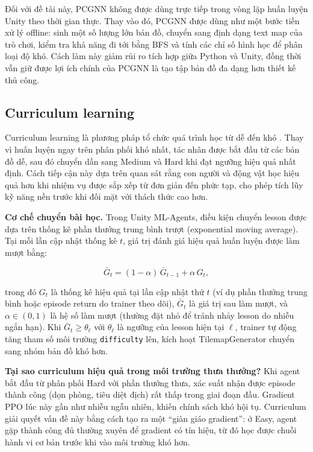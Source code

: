 Đối với đề tài này, PCGNN không được dùng trực tiếp trong vòng lặp huấn luyện Unity theo thời gian thực. Thay vào đó, PCGNN được dùng như một bước tiền xử lý offline: sinh một số lượng lớn bản đồ, chuyển sang định dạng text map của trò chơi, kiểm tra khả năng đi tới bằng BFS và tính các chỉ số hình học để phân loại độ khó. Cách làm này giảm rủi ro tích hợp giữa Python và Unity, đồng thời vẫn giữ được lợi ích chính của PCGNN là tạo tập bản đồ đa dạng hơn thiết kế thủ công.

\subsection{Curriculum learning}

Curriculum learning là phương pháp tổ chức quá trình học từ dễ đến khó \cite{Bengio2009}. Thay vì huấn luyện ngay trên phân phối khó nhất, tác nhân được bắt đầu từ các bản đồ dễ, sau đó chuyển dần sang Medium và Hard khi đạt ngưỡng hiệu quả nhất định. Cách tiếp cận này dựa trên quan sát rằng con người và động vật học hiệu quả hơn khi nhiệm vụ được sắp xếp từ đơn giản đến phức tạp, cho phép tích lũy kỹ năng nền trước khi đối mặt với thách thức cao hơn.

\textbf{Cơ chế chuyển bài học.} Trong Unity ML-Agents, điều kiện chuyển lesson được dựa trên thống kê phần thưởng trung bình trượt (exponential moving average). Tại mỗi lần cập nhật thống kê $t$, giá trị đánh giá hiệu quả huấn luyện được làm mượt bằng:

\begin{equation}
    \bar{G}_t = (1 - \alpha)\,\bar{G}_{t-1} + \alpha\, G_t,
    \label{eq:curriculum_ema}
\end{equation}

trong đó $G_t$ là thống kê hiệu quả tại lần cập nhật thứ $t$ (ví dụ phần thưởng trung bình hoặc episode return do trainer theo dõi), $\bar{G}_t$ là giá trị sau làm mượt, và $\alpha \in (0,1)$ là hệ số làm mượt (thường đặt nhỏ để tránh nhảy lesson do nhiễu ngắn hạn). Khi $\bar{G}_t \geq \theta_\ell$ với $\theta_\ell$ là ngưỡng của lesson hiện tại $\ell$, trainer tự động tăng tham số môi trường \texttt{difficulty} lên, kích hoạt TilemapGenerator chuyển sang nhóm bản đồ khó hơn.

\textbf{Tại sao curriculum hiệu quả trong môi trường thưa thưởng?} Khi agent bắt đầu từ phân phối Hard với phần thưởng thưa, xác suất nhận được episode thành công (dọn phòng, tiêu diệt địch) rất thấp trong giai đoạn đầu. Gradient PPO lúc này gần như nhiễu ngẫu nhiên, khiến chính sách khó hội tụ. Curriculum giải quyết vấn đề này bằng cách tạo ra một ``giàn giáo gradient'': ở Easy, agent gặp thành công đủ thường xuyên để gradient có tín hiệu, từ đó học được chuỗi hành vi cơ bản trước khi vào môi trường khó hơn.

